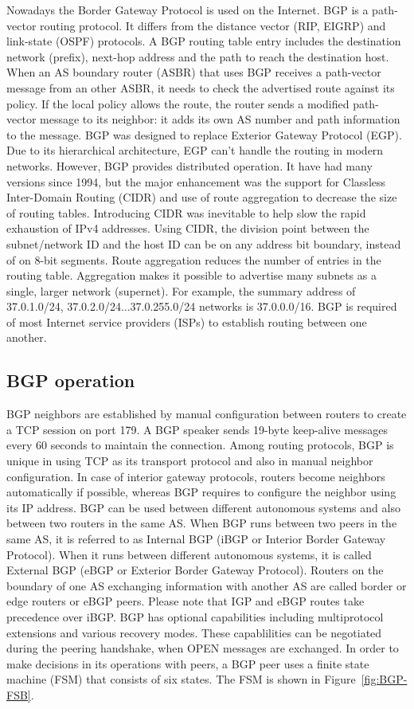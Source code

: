 \documentclass[a4paper]{article}
\begin{document}
Nowadays the Border Gateway Protocol is used on the Internet. BGP is a path-vector routing protocol. It differs from
the distance vector (RIP, EIGRP) and link-state (OSPF) protocols. A BGP routing table entry includes the destination
network (prefix), next-hop address and the path to reach the destination host. When an AS boundary router (ASBR) that
uses BGP receives a path-vector message from an other ASBR, it needs to check the advertised route against its policy.
If the local policy allows the route, the router sends a modified path-vector message to its neighbor: it adds its own
AS number and path information to the message.
BGP was designed to replace Exterior Gateway Protocol (EGP). Due to its hierarchical architecture, EGP can't handle the
routing in modern networks. However, BGP provides distributed operation. It have had many versions since 1994, but the
major enhancement was the support for Classless Inter-Domain Routing (CIDR) and use of route aggregation to decrease
the size of routing tables. Introducing CIDR was inevitable to help slow the rapid exhaustion of IPv4 addresses. Using
CIDR, the division point between the subnet/network ID and the host ID can be on any address bit boundary, instead of
on 8-bit segments. Route aggregation reduces the number of entries in the routing table. Aggregation makes it possible
to advertise many subnets as a single, larger network (supernet). For example, the summary address of 37.0.1.0/24,
37.0.2.0/24...37.0.255.0/24 networks is 37.0.0.0/16. BGP is required of most Internet service providers (ISPs) to
establish routing between one another.

\subsection{BGP operation}

BGP neighbors are established by manual configuration between routers to create a TCP session on port 179. A BGP
speaker sends 19-byte keep-alive messages every 60 seconds to maintain the connection. Among routing protocols, BGP is
unique in using TCP as its transport protocol and also in manual neighbor configuration. In case of interior gateway
protocols, routers become neighbors automatically if possible, whereas BGP requires to configure the neighbor using its
IP address. BGP can be used between different autonomous systems and also between two routers in the same AS. When BGP
runs between two peers in the same AS, it is referred to as Internal BGP (iBGP or Interior Border Gateway Protocol).
When it runs between different autonomous systems, it is called External BGP (eBGP or Exterior Border Gateway
Protocol). Routers on the boundary of one AS exchanging information with another AS are called border or edge routers
or eBGP peers. Please note that IGP and eBGP routes take precedence over iBGP. BGP has optional capabilities including
multiprotocol extensions and various recovery modes. These capablilities can be negotiated during the peering
handshake, when OPEN messages are exchanged. In order to make decisions in its operations with peers, a BGP peer uses a
finite state machine (FSM) that consists of six states. The FSM is shown in Figure~\ref{fig:BGP-FSB}.
\end{document}
